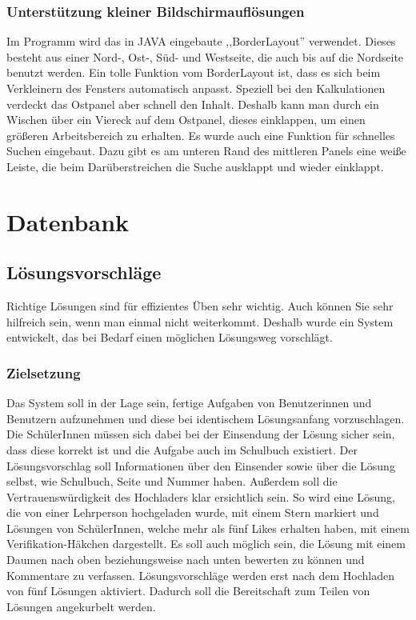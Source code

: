 \documentclass[12pt]{report}
\begin{document}
\section{Unterstützung kleiner Bildschirmauflösungen}
Im Programm wird das in JAVA eingebaute ,,BorderLayout'' verwendet. Dieses besteht aus einer Nord-, Ost-, Süd- und Westseite, die auch bis auf die Nordseite benutzt werden. Ein tolle Funktion vom BorderLayout ist, dass es sich beim Verkleinern des Fensters automatisch anpasst. Speziell bei den Kalkulationen verdeckt das Ostpanel aber schnell den Inhalt. Deshalb kann man durch ein Wischen über ein Viereck auf dem Ostpanel, dieses einklappen, um einen größeren Arbeitsbereich zu erhalten. Es wurde auch eine Funktion für schnelles Suchen eingebaut. Dazu gibt es am unteren Rand des mittleren Panels eine weiße Leiste, die beim Darüberstreichen die Suche ausklappt und wieder einklappt.


\part{Datenbank}


\chapter{Lösungsvorschläge}
 
Richtige Lösungen sind für effizientes Üben sehr wichtig. Auch können Sie sehr hilfreich sein, wenn man einmal nicht weiterkommt. Deshalb wurde ein System entwickelt, das bei Bedarf einen möglichen Lösungsweg vorschlägt.

\section{Zielsetzung}
Das System soll in der Lage sein, fertige Aufgaben von Benutzerinnen und Benutzern aufzunehmen und diese bei identischem Lösungsanfang vorzuschlagen. Die SchülerInnen müssen sich dabei bei der Einsendung der Lösung sicher sein, dass diese korrekt ist und die Aufgabe auch im Schulbuch existiert. Der Lösungsvorschlag soll Informationen über den Einsender sowie über die Lösung selbst, wie Schulbuch, Seite und Nummer haben. Außerdem soll die Vertrauenswürdigkeit des Hochladers klar ersichtlich sein. So wird eine Lösung, die von einer Lehrperson hochgeladen wurde, mit einem Stern markiert und Lösungen von SchülerInnen, welche mehr als fünf Likes erhalten haben, mit einem Verifikation-Häkchen dargestellt. Es soll auch möglich sein, die Lösung mit einem Daumen nach oben beziehungsweise nach unten bewerten zu können und Kommentare zu verfassen. Lösungsvorschläge werden erst nach dem Hochladen von fünf Lösungen aktiviert. Dadurch soll die Bereitschaft zum Teilen von Lösungen angekurbelt werden.
\end{document}
